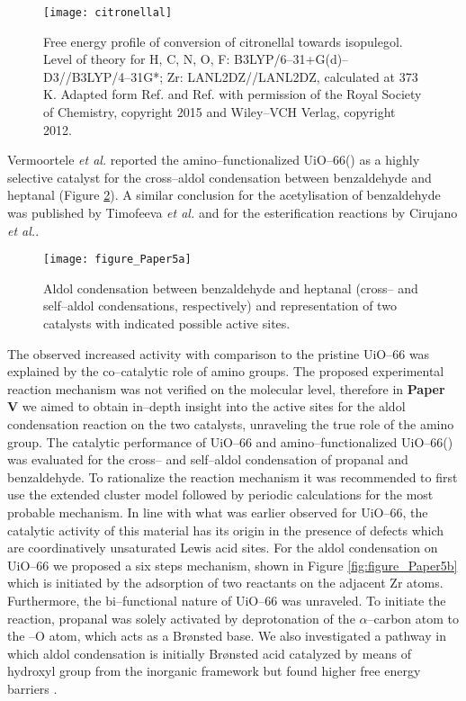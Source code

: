 \begin{figure}[!htp]
	\centering
	\texttt{[image: citronellal]}
	\caption[Free energy profile of
	conversion of citronellal towards isopulegol. Level of theory for
	H, C, N, O, F: B3LYP/6--31+G(d)--D3//B3LYP/  4--31G*; Zr:
	LANL2DZ, calculated at 373 K.]{Free
	energy profile of conversion of citronellal towards isopulegol. Level of theory
	for H, C, N, O, F: B3LYP/6--31+G(d)--D3//B3LYP/4--31G*; Zr:
	LANL2DZ//LANL2DZ, calculated at 373 K. Adapted
	form Ref. \cite{Vandichel2015} and Ref.
	\cite{Vermoortele2012} with permission of the Royal Society of Chemistry,
	copyright 2015 and Wiley--VCH Verlag, copyright 2012.}
	\label{fig:citronellal}
\end{figure}
\npar
\newpage
Vermoortele \textit{et al.}\cite{Vermoortele2011} reported the
amino--functionalized UiO--66() as a highly selective catalyst for the cross--aldol
condensation between benzaldehyde and heptanal (Figure \ref{fig:figure_Paper5a}). A similar conclusion 
for the acetylisation of benzaldehyde was published by Timofeeva \textit{et
al.}\cite{Timofeeva2014} and for the esterification reactions by Cirujano \textit{et
al.}\cite{Cirujano2015}.

\begin{figure}[!htp]
	\centering
	\texttt{[image: figure\_Paper5a]}
	\caption{Aldol condensation between benzaldehyde and heptanal (cross-- and
	self--aldol condensations, respectively) and representation of two
	catalysts with indicated possible active sites.}
	\label{fig:figure_Paper5a}
\end{figure}
\npar
The observed increased activity with comparison to the
pristine UiO--66 was explained by the co--catalytic role of amino groups. The
proposed experimental reaction mechanism was not verified on the molecular level,
therefore in \textbf{Paper V} we aimed to obtain in--depth insight into the
active sites for the aldol condensation reaction on the two catalysts,
unraveling the true role of the amino group. The catalytic performance of
UiO--66 and amino--functionalized UiO--66() was evaluated for the
cross-- and self--aldol condensation of propanal and benzaldehyde. To rationalize the
reaction mechanism it was recommended to first use the extended cluster model followed
by periodic calculations for the most probable mechanism. In line with what
was earlier observed for UiO--66, the catalytic activity of this material has
its origin in the presence of defects which are coordinatively unsaturated Lewis
acid sites. For the aldol condensation on UiO--66 we proposed a six steps
mechanism, shown in Figure \ref{fig:figure_Paper5b} which is initiated by the
adsorption of two reactants on the adjacent Zr atoms. Furthermore, the
bi--functional nature of UiO--66 was unraveled. To initiate the reaction, propanal was
solely activated by deprotonation of the $\alpha$--carbon atom to the
--O atom, which acts as a Br\o{}nsted
base. We also investigated a pathway in which aldol condensation is initially
Br\o{}nsted acid catalyzed by means of hydroxyl group from the inorganic
framework but found higher free energy barriers \cite{Hajek2015}.

